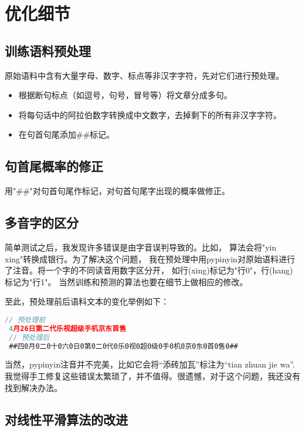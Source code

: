 \documentclass[12pt, UTF8, a4paper]{ctexart}
\begin{document}
\section{优化细节}

\subsection{训练语料预处理}

原始语料中含有大量字母、数字、标点等非汉字字符，先对它们进行预处理。

\begin{itemize}
    \item 根据断句标点（如逗号，句号，冒号等）将文章分成多句。
    \item 将每句话中的阿拉伯数字转换成中文数字，去掉剩下的所有非汉字字符。
    \item 在句首句尾添加\#\#标记。
\end{itemize}

\subsection{句首尾概率的修正}

用"\#\#"对句首句尾作标记，对句首句尾字出现的概率做修正。

\subsection{多音字的区分}

简单测试之后，我发现许多错误是由字音误判导致的。比如，
算法会将"yin xing"转换成银行。为了解决这个问题，
我在预处理中用pypinyin对原始语料进行了注音。将一个字的不同读音用数字区分开，
如行(xing)标记为"行0"，行(hang)标记为"行1"。
当然训练和预测的算法也要在细节上做相应的修改。

至此，预处理前后语料文本的变化举例如下：

\begin{lstlisting}[language=js]
 // 预处理前
 4月26日第二代乐视超级手机京东首售
 // 预处理后
 ##四0月0二0十0六0日0第0二0代0乐0视0超0级0手0机0京0东0首0售0##
\end{lstlisting}

当然，pypinyin注音并不完美，比如它会将“添砖加瓦”标注为“tian zhuan jie wa”.
我觉得手工修复这些错误太繁琐了，并不值得。很遗憾，对于这个问题，我还没有找到解决办法。

\subsection{对线性平滑算法的改进}
\end{document}

